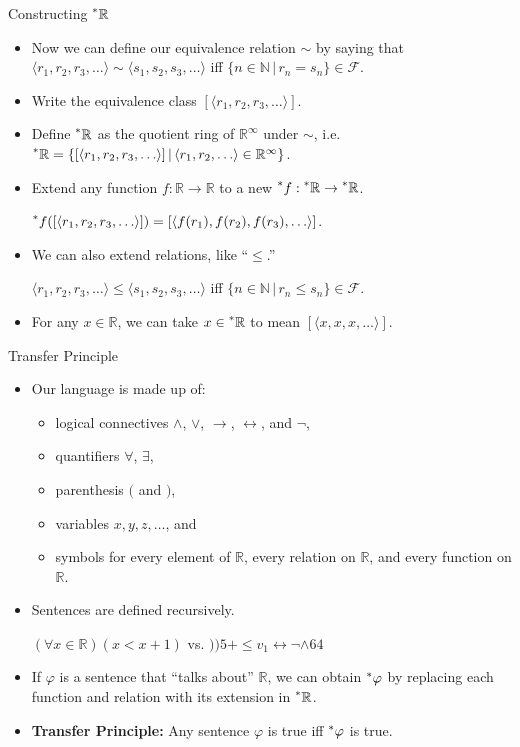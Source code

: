 \documentclass{beamer}
\theoremstyle{plain}
\theoremstyle{definition}
\newcommand{\sthat}{\,|\,}
\newcommand{\reals}{\mathbb{R}}
\newcommand{\hreals}{\prescript{*}{}{\mathbb{R}}}
\newcommand{\nats}{\mathbb{N}}
\newcommand{\hr}[1]{\prescript{*}{}{#1}}
\begin{document}
\begin{frame}{Constructing $\hreals$}
\begin{itemize}
\setlength{\itemsep}{8pt}

\item Now we can define our equivalence relation $\sim$ by saying that $\langle r_1, r_2, r_3, \ldots \rangle \sim \langle s_1, s_2, s_3, \ldots \rangle$ iff $\{n \in \nats \sthat r_n = s_n \} \in \mathcal{F}$.

\item Write the equivalence class $[\langle r_1, r_2, r_3, \ldots \rangle]$.

\item Define $\hreals$ as the quotient ring of $\reals^\infty$ under $\sim$, i.e. $\hreals = \{[\langle r_1, r_2, r_3, \ldots \rangle] \sthat \langle r_1, r_2, \ldots \rangle \in \reals^\infty\}$.

\item Extend any function $f: \reals \to \reals$ to a new $\hr{f}: \hreals \to \hreals$.

$\hr{f}([\langle r_1, r_2, r_3, \ldots \rangle]) = [\langle f(r_1), f(r_2), f(r_3), \ldots \rangle]$.

\item We can also extend relations, like ``$\leq$.'' 

$\langle r_1, r_2, r_3, \ldots \rangle \leq \langle s_1, s_2, s_3, \ldots \rangle$ iff $\{n \in \nats \sthat r_n \leq s_n\} \in \mathcal{F}$.

\item For any $x \in \reals$, we can take $x \in \hreals$ to mean $[\langle x, x, x, \ldots \rangle]$.
\end{itemize}
\end{frame}

\begin{frame}{Transfer Principle}
\begin{itemize}
\setlength{\itemsep}{8pt}
\item Our language is made up of:
	\begin{itemize}
	\item logical connectives $\land$, $\lor$, $\to$, $\leftrightarrow$, and $\neg$,
	\item quantifiers $\forall$, $\exists$,
	\item parenthesis $($ and $)$,
	\item variables $x, y, z, \ldots$, and
	\item symbols for every element of $\reals$, every relation on $\reals$, and every function on $\reals$.
	\end{itemize}
\item Sentences are defined recursively. 

$(\forall x \in \reals)(x < x + 1)$ vs. $))5+\leq v_1 \leftrightarrow \neg \land 64$
\item If $\varphi$ is a sentence that ``talks about'' $\reals$, we can obtain $\hr{\varphi}$ by replacing each function and relation with its extension in $\hreals$.
\item \textbf{Transfer Principle:} Any sentence $\varphi$ is true iff $\hr{\varphi}$ is true.
\end{itemize}
\end{frame}
\end{document}

